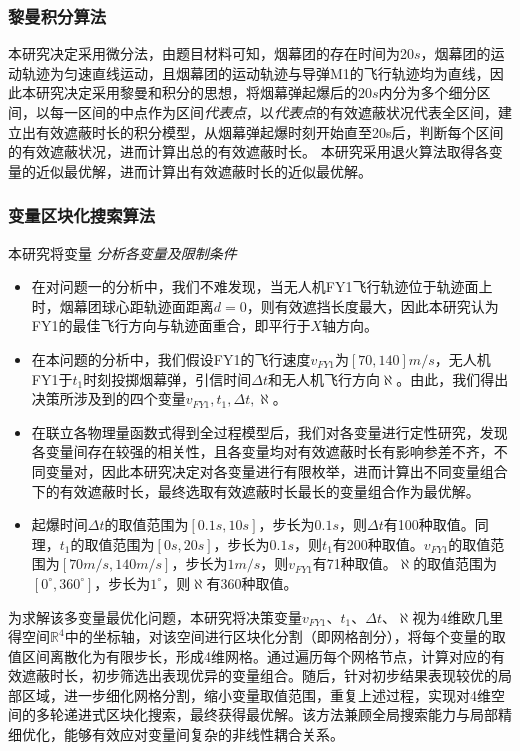 \documentclass{article}
\begin{document}
\subsubsection{黎曼积分算法}
本研究决定采用微分法，由题目材料可知，烟幕团的存在时间为20$s$，烟幕团的运动轨迹为匀速直线运动，且烟幕团的运动轨迹与导弹M1的飞行轨迹均为直线，因此本研究决定采用黎曼和积分的思想，将烟幕弹起爆后的$20s$内分为多个细分区间，以每一区间的中点作为区间\textit{代表点}，以\textit{代表点}的有效遮蔽状况代表全区间，建立出有效遮蔽时长的积分模型，从烟幕弹起爆时刻开始直至20s后，判断每个区间的有效遮蔽状况，进而计算出总的有效遮蔽时长。
本研究采用退火算法取得各变量的近似最优解，进而计算出有效遮蔽时长的近似最优解。

\subsubsection{变量区块化搜索算法}
本研究将变量
\textit{分析各变量及限制条件}
\begin{itemize}
    \item 在对问题一的分析中，我们不难发现，当无人机FY1飞行轨迹位于轨迹面上时，烟幕团球心距轨迹面距离$d=0$，则有效遮挡长度最大，因此本研究认为FY1的最佳飞行方向与轨迹面重合，即平行于$X$轴方向。
    \item 在本问题的分析中，我们假设FY1的飞行速度$v_{FY1}$为$[70,140]m/s$，无人机FY1于$t_1$时刻投掷烟幕弹，引信时间$\Delta t$和无人机飞行方向$\aleph$。由此，我们得出决策所涉及到的四个变量$v_{FY1},t_1,\Delta t,\aleph$。
    \item 在联立各物理量函数式得到全过程模型后，我们对各变量进行定性研究，发现各变量间存在较强的相关性，且各变量均对有效遮蔽时长有影响参差不齐，不同变量对，因此本研究决定对各变量进行有限枚举，进而计算出不同变量组合下的有效遮蔽时长，最终选取有效遮蔽时长最长的变量组合作为最优解。
    \item 起爆时间$\Delta t$的取值范围为$[0.1s,10s]$，步长为$0.1s$，则$\Delta t$有100种取值。同理，$t_1$的取值范围为$[0s,20s]$，步长为$0.1s$，则$t_1$有200种取值。$v_{FY1}$的取值范围为$[70m/s,140m/s]$，步长为$1m/s$，则$v_{FY1}$有71种取值。$\aleph$的取值范围为$[0^\circ,360^\circ]$，步长为$1^\circ$，则$\aleph$有360种取值。
\end{itemize}
为求解该多变量最优化问题，本研究将决策变量$v_{FY1}$、$t_1$、$\Delta t$、$\aleph$视为4维欧几里得空间$\mathbb{R}^4$中的坐标轴，对该空间进行区块化分割（即网格剖分），将每个变量的取值区间离散化为有限步长，形成4维网格。通过遍历每个网格节点，计算对应的有效遮蔽时长，初步筛选出表现优异的变量组合。随后，针对初步结果表现较优的局部区域，进一步细化网格分割，缩小变量取值范围，重复上述过程，实现对4维空间的多轮递进式区块化搜索，最终获得最优解。该方法兼顾全局搜索能力与局部精细优化，能够有效应对变量间复杂的非线性耦合关系。
\end{document}
